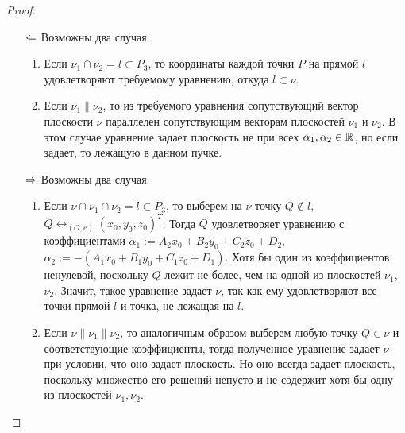     \begin{proof}~
    	\begin{itemize}
    		\item[$\Leftarrow$] Возможны два случая:
    		\begin{enumerate}
    			\item Если $\nu_1 \cap \nu_2 = l \subset P_3$, то координаты каждой точки $P$ на прямой $l$ удовлетворяют требуемому уравнению, откуда $l \subset \nu$.
    			\item Если $\nu_1 \parallel \nu_2$, то из требуемого уравнения сопутствующий вектор плоскости $\nu$ параллелен сопутствующим векторам плоскостей $\nu_1$ и $\nu_2$. В этом случае уравнение задает плоскость не при всех $\alpha_1, \alpha_2 \in \mathbb{R}$, но если задает, то лежащую в данном пучке.
    		\end{enumerate}
    		
    		\item[$\Rightarrow$] Возможны два случая:
    		\begin{enumerate}
    			\item Если $\nu \cap \nu_1 \cap \nu_2 = l \subset P_3$, то выберем на $\nu$ точку $Q \not\in l$, $Q \leftrightarrow_{(O, e)} (x_0, y_0, z_0)^T$. Тогда $Q$ удовлетворяет уравнению с коэффициентами $\alpha_1 := A_2x_0+B_2y_0+C_2z_0 + D_2$, $\alpha_2 := -(A_1x_0+B_1y_0+C_1z_0 + D_1)$. Хотя бы один из коэффициентов ненулевой, поскольку $Q$ лежит не более, чем на одной из плоскостей $\nu_1$, $\nu_2$. Значит, такое уравнение задает $\nu$, так как ему удовлетворяют все точки прямой $l$ и точка, не лежащая на $l$.
    			
    			\item Если $\nu \parallel \nu_1 \parallel \nu_2$, то аналогичным образом выберем любую точку $Q \in \nu$ и соответствующие коэффициенты, тогда полученное уравнение задает $\nu$ при условии, что оно задает плоскость. Но оно всегда задает плоскость, поскольку множество его решений непусто и не содержит хотя бы одну из плоскостей $\nu_1, \nu_2$.\qedhere
    		\end{enumerate}
    	\end{itemize}
    \end{proof}